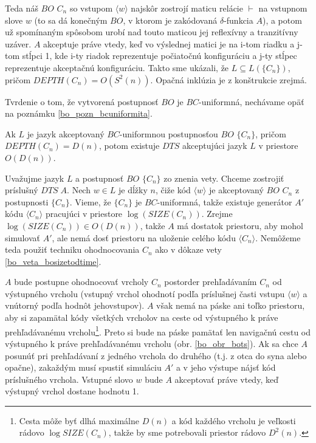{\begin{dokaz}
Teda náš $BO$ $C_n$ so vstupom $\langle w\rangle$ najskôr zostrojí
maticu relácie $\vdash$ na vstupnom slove $w$ (to sa dá konečným
$BO$, v ktorom je zakódovaná $\delta$-funkcia $A$), a potom už
spomínaným spôsobom urobí nad touto maticou jej reflexívny a
tranzitívny uzáver. $A$ akceptuje práve vtedy, keď vo výslednej
matici je na i-tom riadku a j-tom stĺpci 1, kde i-ty riadok
reprezentuje počiatočnú konfiguráciu a j-ty stĺpec reprezentuje
akceptačnú konfiguráciu. Takto sme ukázali, že $L\subseteq L(\{
C_n\})$, pričom $DEPTH(C_n)=O(S^2(n))$. Opačná inklúzia je z
konštrukcie zrejmá.

Tvrdenie o tom, že vytvorená postupnosť $BO$ je $BC$-uniformná,
nechávame opäť na poznámku \ref{bo_pozn_bcuniformita}.
\end{dokaz}

\begin{veta}
\label{bo_veta_bodepthtodspace}

Ak $L$ je jazyk akceptovaný $BC$-uniformnou postupnosťou $BO$ $\{
C_n\}$, pričom\linebreak $DEPTH(C_n)=D(n)$, potom existuje $DTS$
akceptujúci jazyk $L$ v priestore $O(D(n))$.
\end{veta}

\begin{dokaz}
Uvažujme jazyk $L$ a postupnosť $BO$ $\{ C_n\}$ zo znenia vety.
Chceme zostrojiť príslušný $DTS\;A$. Nech $w\in L$ je dĺžky $n$, čiže
kód $\langle w\rangle$ je akceptovaný $BO$ $C_n$ z postupnosti $\{
C_n\}$. Vieme, že $\{ C_n\}$ je $BC$-uniformná, takže existuje
generátor $A'$ kódu $\langle C_n\rangle$ pracujúci v priestore
$\log (SIZE(C_n))$. Zrejme $\log (SIZE(C_n))\in O(D(n))$, takže $A$ má
dostatok priestoru, aby mohol simulovať $A'$, ale nemá dosť
priestoru na uloženie celého kódu $\langle C_n\rangle$. Nemôžeme
teda použiť techniku ohodnocovania $C_n$ ako v dôkaze vety
\ref{bo_veta_bosizetodtime}.

$A$ bude postupne ohodnocovať vrcholy $C_n$ postorder
prehľadávaním $C_n$ od výstupného vrcholu (vstupný vrchol ohodnotí
podľa príslušnej časti vstupu $\langle w\rangle$ a vnútorný podľa
hodnôt jeho\linebreak vstupov). $A$ však nemá na páske ani toľko
priestoru, aby si zapamätal kódy všetkých vrcholov na ceste od
výstupného k práve prehľadávanému vrcholu\footnote{Cesta môže byť
dlhá maximálne $D(n)$ a kód každého vrcholu je veľkosti rádovo
$\log SIZE(C_n)$, takže by sme potrebovali priestor rádovo $D^2(n)$.}. Preto
si bude na páske pamätať len navigačnú cestu od výstupného k práve
prehľadávanému vrcholu (obr. \ref{bo_obr_bots}). Ak sa chce $A$ posunúť pri
prehľadávaní z jedného vrchola do druhého (t.j. z otca do syna
alebo opačne), zakaždým musí spustiť simuláciu $A'$ a v jeho
výstupe nájsť kód príslušného vrchola. Vstupné slovo $w$ bude $A$
akceptovať práve vtedy, keď výstupný vrchol dostane hodnotu 1.


\end{dokaz}}
